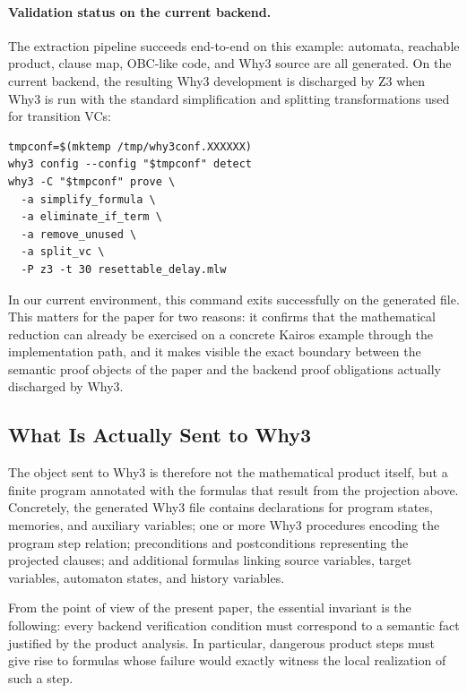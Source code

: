\documentclass[11pt,a4paper]{article}
\begin{document}
\paragraph{Validation status on the current backend.}
The extraction pipeline succeeds end-to-end on this example: automata,
reachable product, clause map, OBC-like code, and Why3 source are all
generated. On the current backend, the resulting Why3 development is discharged
by Z3 when Why3 is run with the standard simplification and splitting
transformations used for transition VCs:
\begin{verbatim}
tmpconf=$(mktemp /tmp/why3conf.XXXXXX)
why3 config --config "$tmpconf" detect
why3 -C "$tmpconf" prove \
  -a simplify_formula \
  -a eliminate_if_term \
  -a remove_unused \
  -a split_vc \
  -P z3 -t 30 resettable_delay.mlw
\end{verbatim}
In our current environment, this command exits successfully on the generated
file. This matters for the paper for two reasons:
it confirms that the mathematical reduction can already be exercised on a
concrete Kairos example through the implementation path, and it makes visible
the exact boundary between the semantic proof objects of the paper and the
backend proof obligations actually discharged by Why3.

\subsection{What Is Actually Sent to Why3}

The object sent to Why3 is therefore not the mathematical product itself, but a
finite program annotated with the formulas that result from the projection
above. Concretely, the generated Why3 file contains declarations for program
states, memories, and auxiliary variables; one or more Why3 procedures
encoding the program step relation; preconditions and postconditions
representing the projected clauses; and additional formulas linking source
variables, target variables, automaton states, and history variables.

From the point of view of the present paper, the essential invariant is the
following: every backend verification condition must correspond to a semantic
fact justified by the product analysis. In particular, dangerous product steps
must give rise to formulas whose failure would exactly witness the local
realization of such a step.
\end{document}
